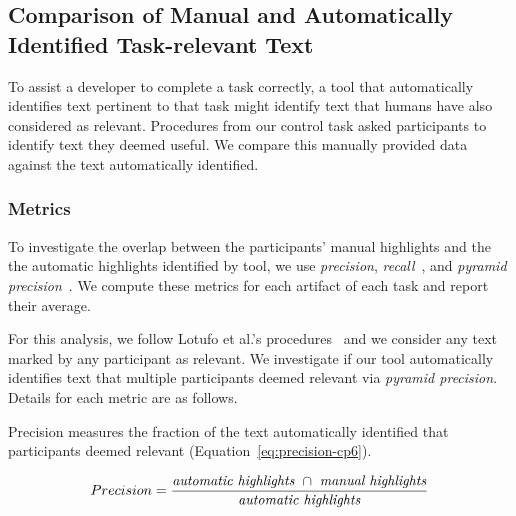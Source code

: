 
\subsection{Comparison of Manual and Automatically Identified Task-relevant Text}
\label{cp6:comparison}



To assist a developer to complete a task correctly, a tool that
automatically identifies text pertinent to that task might 
identify text that humans have also considered as relevant.
Procedures from our control task asked participants to identify text they deemed useful. We
 compare this manually provided data against the text automatically identified.




\subsubsection{Metrics}

To investigate the overlap between the participants' manual highlights and the 
the automatic highlights identified by \acs{tool}, we use \textit{precision}, 
\textit{recall}~\cite{manning2010IR}, and \textit{pyramid precision}~\cite{Nenkova2004}.
We compute these metrics for each artifact of each task and report their average.


For this analysis, we follow Lotufo et al.'s procedures~\cite{Lotufo2012} and we consider any text marked by any participant as relevant.
We investigate if our tool  automatically identifies text that multiple participants deemed relevant
 via \textit{pyramid precision}. 
Details for each metric are as follows. 


Precision measures the fraction of the text automatically identified  that participants deemed relevant (Equation~\ref{eq:precision-cp6}). 

\medskip
\begin{small}
\begin{equation}
    Precision = \frac{
        \text{\textit{automatic highlights}~} \cap 
        \text{~\textit{manual highlights}}
    }{\text{\textit{automatic highlights}}}
\label{eq:precision-cp6}    
\end{equation}
\end{small}


